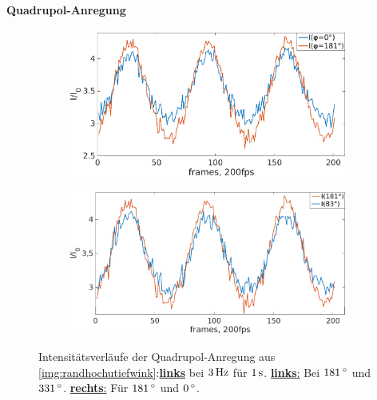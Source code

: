 \documentclass[numbers=noenddot,a4paper]{scrartcl}
\newcommand{\degree}{^\circ}
\newcommand{\fett}[1]{\textbf{#1}}
\begin{document}
				\paragraph{Quadrupol-Anregung}

						\begin{figure}[!b]
							\centering
							\begin{subfigure}{0.49\textwidth}
								\centering
								\includegraphics[width=\textwidth,height=0.65\textwidth]{figs/auswertung/intens0u180quad3Hz1sek.png}
							\end{subfigure}
							\begin{subfigure}{0.49\textwidth}
								\centering
								\includegraphics[width=\textwidth,height=0.65\textwidth]{figs/auswertung/intens83u180quadinphase3Hz1sek.png}
							\end{subfigure}
							\caption{Intensitätsverläufe der Quadrupol-Anregung aus \ref{img:randhochutiefwink}:\underline{\fett{links}} bei $\unit[3]{Hz}$ für $\unit[1]{s}$. \underline{\fett{links}:} Bei $\unit[181]{\degree}$ und $\unit[331]{\degree}$. \underline{\fett{rechts}:} Für $\unit[181]{\degree}$  und $\unit[0]{\degree}$.}
							\label{img:intensquadhochwink}
						\end{figure}
\end{document}
